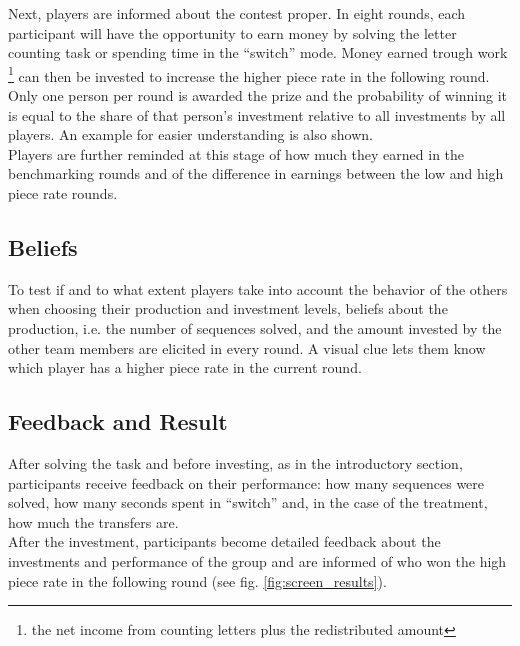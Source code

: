     Next, players are informed  about the contest proper. In eight rounds, each participant will have the opportunity to earn money by solving the letter counting task or spending time in the ``switch'' mode. Money earned trough work \footnote{the net income from counting letters plus the redistributed amount} can then be invested to increase the higher piece rate in the following round. Only one person per round is awarded the prize and the probability of winning it is equal to the share of that person's investment relative to all investments by all players. An example for easier understanding is also shown.\\
    
    Players are further reminded at this stage of how much they earned in the benchmarking rounds and of the difference in earnings between the low and high piece rate rounds.
    
    \subsection{Beliefs}
    
    To test if and to what extent players take into account the behavior of the others when choosing their production and investment levels, beliefs about the production, i.e. the number of sequences solved, and the amount invested by the other team members are elicited in every round. A visual clue lets them know which player has a higher piece rate in the current round.
    
    \subsection{Feedback and Result}
    
    After solving the task and before investing, as in the introductory section, participants receive feedback on their performance: how many sequences were solved, how many seconds spent in ``switch'' and, in the case of the treatment, how much the transfers are.\\
    
    After the investment, participants become detailed feedback about the investments and performance of the group and are informed of who won the high piece rate in the following round (see fig. \ref{fig:screen_results}).
    
